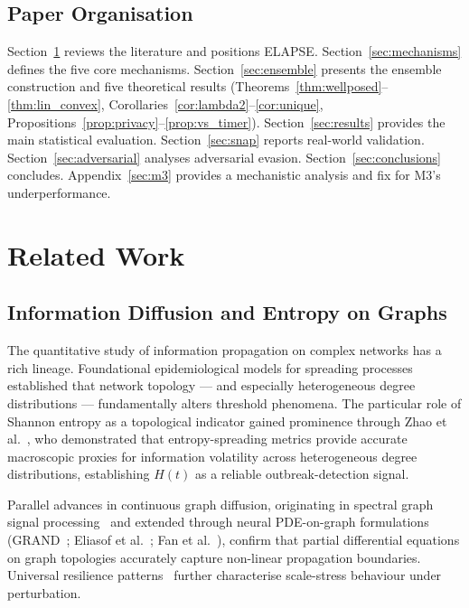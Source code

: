 \documentclass[review,12pt]{elsarticle}
\begin{document}
\subsection{Paper Organisation}

Section~\ref{sec:related} reviews the literature and positions ELAPSE.
Section~\ref{sec:mechanisms} defines the five core mechanisms.
Section~\ref{sec:ensemble} presents the ensemble construction and five
theoretical results (Theorems~\ref{thm:wellposed}--\ref{thm:lin_convex},
Corollaries~\ref{cor:lambda2}--\ref{cor:unique},
Propositions~\ref{prop:privacy}--\ref{prop:vs_timer}).
Section~\ref{sec:results} provides the main statistical evaluation.
Section~\ref{sec:snap} reports real-world validation.
Section~\ref{sec:adversarial} analyses adversarial evasion.
Section~\ref{sec:conclusions} concludes.
Appendix~\ref{sec:m3} provides a mechanistic analysis and fix for
M3's underperformance.

\section{Related Work}
\label{sec:related}

\subsection{Information Diffusion and Entropy on Graphs}

The quantitative study of information propagation on complex networks has a
rich lineage. Foundational epidemiological models for spreading
processes~\cite{pastor2015epidemic} established that network topology --- and
especially heterogeneous degree distributions --- fundamentally alters
threshold phenomena. The particular role of Shannon entropy as a topological
indicator gained prominence through Zhao et al.~\cite{zhao2024multi}, who
demonstrated that entropy-spreading metrics provide accurate macroscopic proxies
for information volatility across heterogeneous degree distributions, establishing
$H(t)$ as a reliable outbreak-detection signal.

Parallel advances in continuous graph diffusion, originating in spectral graph
signal processing~\cite{shuman2013emerging} and extended through neural
PDE-on-graph formulations (GRAND~\cite{chamberlain2021grand};
Eliasof et al.~\cite{eliasof2024graph}; Fan et al.~\cite{fan2024graph}), confirm
that partial differential equations on graph topologies accurately capture
non-linear propagation boundaries. Universal resilience patterns~\cite{gao2016universal}
further characterise scale-stress behaviour under perturbation.
\end{document}

